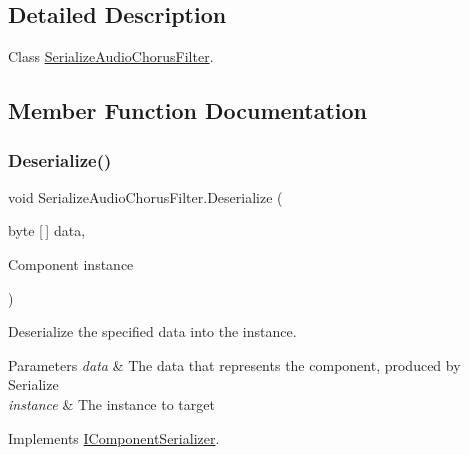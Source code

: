 \subsection{Detailed Description}
Class \hyperlink{class_serialize_audio_chorus_filter}{Serialize\+Audio\+Chorus\+Filter}. 



\subsection{Member Function Documentation}
\mbox{\label{class_serialize_audio_chorus_filter_a2e5e9eeee7a3053843911ddd0ca0ae00}} 
\subsubsection{\texorpdfstring{Deserialize()}{Deserialize()}}
{\footnotesize\ttfamily void Serialize\+Audio\+Chorus\+Filter.\+Deserialize (\begin{DoxyParamCaption}\item[{byte \mbox{[}$\,$\mbox{]}}]{data,  }\item[{Component}]{instance }\end{DoxyParamCaption})\hspace{0.3cm}{\ttfamily [inline]}}



Deserialize the specified data into the instance. 


\begin{DoxyParams}{Parameters}
{\em data} & The data that represents the component, produced by Serialize\\
\hline
{\em instance} & The instance to target\\
\hline
\end{DoxyParams}


Implements \hyperlink{interface_i_component_serializer_a4cc366a5c78b33d47a90c209d8fed883}{I\+Component\+Serializer}.

\mbox{\label{class_serialize_audio_chorus_filter_a1cedba3237b73240c2fb96f8831dc834}} 
